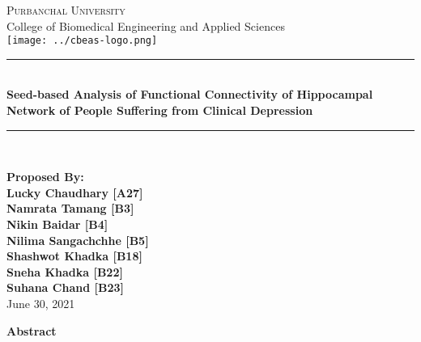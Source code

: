 \documentclass{article}
\newcommand{\HRule}{\rule{\linewidth}{0.1mm}}
\begin{document}
\begin{titlepage}
\begin{center}

  \textsc{\huge Purbanchal University}\\[1cm]
  {\huge College of Biomedical Engineering and Applied Sciences}\\[1cm]
  \texttt{[image: ../cbeas-logo.png]}\\[1cm]

  \color{red} \HRule \\[0.4cm] \color{black}
  {\huge \bfseries Seed-based Analysis of Functional Connectivity of
  Hippocampal Network of People Suffering from Clinical Depression}\\[0.2cm]
  \color{red} \HRule \\[2cm] \color{black}

\textbf{
  \Large Proposed By:\\[0.2cm]
\Large Lucky Chaudhary [A27]\\ Namrata Tamang [B3]\\ Nikin Baidar
  [B4]\\ Nilima Sangachchhe [B5]\\ Shashwot Khadka [B18]\\ Sneha
  Khadka [B22]\\Suhana Chand [B23]\\[1cm]}
\vfill
{\Large June 30, 2021}

\end{center}
\end{titlepage}

  \iffalse

    market ma mental disorder ko lagi widely accepted kunai pani
    imaging wa molecular basis chaina

    research haru bhako cha tara reverse fallacy le garda they are
    rather believed to be useless and inaccurate.

    tara advancements haru bhairacha and hamro reasearch le tyo
    advancement ma contribute garcha

  \fi

\begin{center}
  \textbf{\large Abstract}
\end{center}
\end{document}
